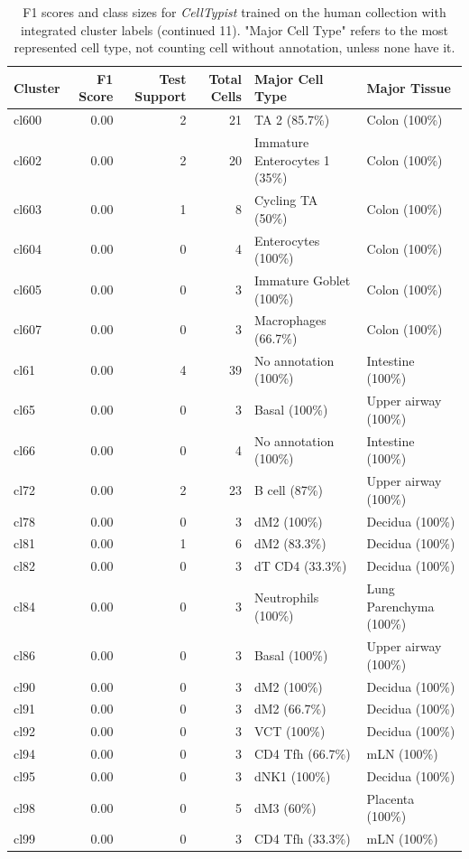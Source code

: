 \begin{table}[ht!]
\scriptsize
\caption[F1 scores and class sizes for \textit{CellTypist} trained on the human collection with integrated cluster labels (continued 11)]{F1 scores and class sizes for \textit{CellTypist} trained on the human collection with integrated cluster labels (continued 11). "Major Cell Type" refers to the most represented cell type, not counting cell without annotation, unless none have it.}
\centering
\label{table:tab_HAmodelclust11}
\begin{tabular}{lrrrll}
  \toprule
Cluster & F1 Score & Test Support & Total Cells & Major Cell Type & Major Tissue \\ 
  \midrule  
  cl600 & 0.00 &   2 &  21 & TA 2 (85.7\%) & Colon (100\%) \\ 
  cl602 & 0.00 &   2 &  20 & Immature Enterocytes 1 (35\%) & Colon (100\%) \\ 
  cl603 & 0.00 &   1 &   8 & Cycling TA (50\%) & Colon (100\%) \\ 
  cl604 & 0.00 &   0 &   4 & Enterocytes (100\%) & Colon (100\%) \\ 
  cl605 & 0.00 &   0 &   3 & Immature Goblet (100\%) & Colon (100\%) \\ 
  cl607 & 0.00 &   0 &   3 & Macrophages (66.7\%) & Colon (100\%) \\ 
  cl61 & 0.00 &   4 &  39 & No annotation (100\%) & Intestine (100\%) \\ 
  cl65 & 0.00 &   0 &   3 & Basal (100\%) & Upper airway (100\%) \\ 
  cl66 & 0.00 &   0 &   4 & No annotation (100\%) & Intestine (100\%) \\ 
  cl72 & 0.00 &   2 &  23 & B cell (87\%) & Upper airway (100\%) \\ 
  cl78 & 0.00 &   0 &   3 & dM2 (100\%) & Decidua (100\%) \\ 
  cl81 & 0.00 &   1 &   6 & dM2 (83.3\%) & Decidua (100\%) \\ 
  cl82 & 0.00 &   0 &   3 & dT CD4 (33.3\%) & Decidua (100\%) \\ 
  cl84 & 0.00 &   0 &   3 & Neutrophils (100\%) & Lung Parenchyma (100\%) \\ 
  cl86 & 0.00 &   0 &   3 & Basal (100\%) & Upper airway (100\%) \\ 
  cl90 & 0.00 &   0 &   3 & dM2 (100\%) & Decidua (100\%) \\ 
  cl91 & 0.00 &   0 &   3 & dM2 (66.7\%) & Decidua (100\%) \\ 
  cl92 & 0.00 &   0 &   3 & VCT (100\%) & Decidua (100\%) \\ 
  cl94 & 0.00 &   0 &   3 & CD4 Tfh (66.7\%) & mLN (100\%) \\ 
  cl95 & 0.00 &   0 &   3 & dNK1 (100\%) & Decidua (100\%) \\ 
  cl98 & 0.00 &   0 &   5 & dM3 (60\%) & Placenta (100\%) \\ 
  cl99 & 0.00 &   0 &   3 & CD4 Tfh (33.3\%) & mLN (100\%) \\ 
   \bottomrule
\end{tabular}
\end{table}
